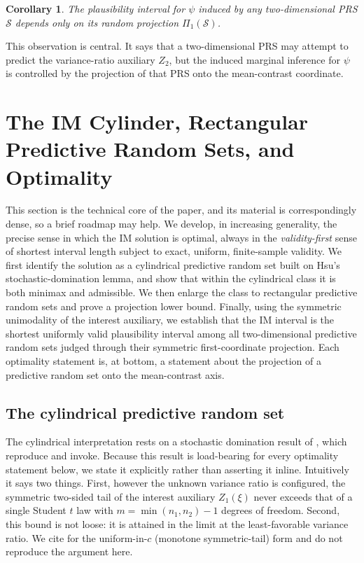 \documentclass[12pt]{article}
\newtheorem{corollary}{Corollary}
\begin{document}
\begin{corollary}
The plausibility interval for \(\psi\) induced by any two-dimensional PRS
\(\mathcal S\) depends only on its random projection \(\Pi_1(\mathcal S)\).
\end{corollary}

This observation is central.  It says that a two-dimensional PRS may attempt
to predict the variance-ratio auxiliary \(Z_2\), but the induced marginal
inference for \(\psi\) is controlled by the projection of that PRS onto the
mean-contrast coordinate.

\section{The IM Cylinder, Rectangular Predictive Random Sets, and Optimality}
\label{sec:cylinder}

This section is the technical core of the paper, and its material is
correspondingly dense, so a brief roadmap may help.  We develop, in increasing
generality, the precise sense in which the IM solution is optimal, always in the
\emph{validity-first} sense of shortest interval length subject to exact, uniform,
finite-sample validity.  We first identify the solution as a cylindrical
predictive random set built on Hsu's stochastic-domination lemma, and show that
within the cylindrical class it is both minimax and admissible.  We then enlarge
the class to rectangular predictive random sets and prove a projection lower
bound.  Finally, using the symmetric unimodality of the interest auxiliary, we
establish that the IM interval is the shortest uniformly valid plausibility
interval among all two-dimensional predictive random sets judged through their
symmetric first-coordinate projection.  Each optimality statement is, at bottom, a
statement about the projection of a predictive random set onto the mean-contrast
axis.

\subsection{The cylindrical predictive random set}

The cylindrical interpretation rests on a stochastic domination result of
\citet{Hsu1938}, which \citet{MartinLiu2015Marginal} reproduce and invoke.
Because this result is load-bearing for every optimality statement below, we
state it explicitly rather than asserting it inline.  Intuitively it says two
things.  First, however the unknown variance ratio is configured, the symmetric
two-sided tail of the interest auxiliary \(Z_1(\xi)\) never exceeds that of a
single Student \(t\) law with \(m=\min(n_1,n_2)-1\) degrees of freedom.  Second,
this bound is not loose: it is attained in the limit at the least-favorable
variance ratio.  We cite \citet{Hsu1938} for the
uniform-in-\(c\) (monotone symmetric-tail) form and do not reproduce the
argument here.
\end{document}
